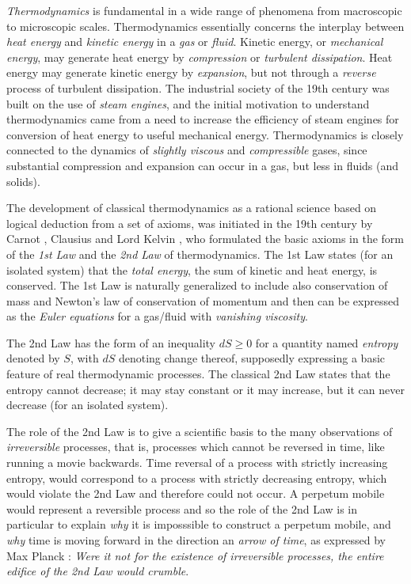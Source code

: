 \emph{Thermodynamics} is fundamental in a wide range of phenomena from
macroscopic to microscopic scales. 
Thermodynamics essentially concerns the interplay between \emph{heat energy} 
and \emph{kinetic energy} in a \emph{gas} or \emph{fluid}. 
Kinetic energy, or \emph{mechanical energy}, 
may generate heat energy by 
\emph{compression}
or \emph{turbulent dissipation}. 
Heat energy may generate kinetic energy by \emph{expansion}, but
not through a \emph{reverse} process of turbulent dissipation. 
The industrial society
of the 19th century was built on the use of \emph{steam engines}, and the 
initial motivation to understand thermodynamics came from a need to
increase the efficiency of steam engines for conversion of heat energy to
useful mechanical energy. 
Thermodynamics is closely connected to the dynamics of \emph{slightly viscous}
and \emph{compressible} gases, since substantial compression and 
expansion can occur in a gas, but less in fluids (and solids).

The development of classical thermodynamics as a rational science 
based on logical deduction from a set of axioms, was initiated in 
the 19th century by Carnot \cite{carnot}, Clausius 
\cite{clausius} and Lord Kelvin \cite{kelvin}, who formulated
the basic axioms in the form of the \emph{1st Law} and the \emph{2nd Law} of
thermodynamics. The 1st Law states (for an isolated system)
that the \emph{total energy},
the sum of kinetic and heat energy, is conserved.
The 1st Law is naturally generalized to include also conservation 
of mass and Newton's law of conservation of momentum and then 
can be expressed as the \emph{Euler equations} for  a gas/fluid 
with \emph{vanishing viscosity}.

The 2nd Law has the form of an inequality 
$dS\ge 0$ for a quantity
named \emph{entropy} denoted by
$S$, with $dS$ denoting change thereof, supposedly  
expressing a basic feature of real thermodynamic processes.
The classical 2nd Law states that the entropy cannot decrease; 
it may stay constant or it may increase,
but it can never decrease (for an isolated system). 

The role of the 2nd Law is
to give a scientific basis to the many observations  
of \emph{irreversible} processes, that is, processes which cannot 
be reversed in time, like running a movie backwards. 
Time reversal of a 
process with strictly increasing entropy, would correspond
to a process with strictly 
decreasing entropy, which would violate the 2nd Law and therefore could
not occur. A perpetum mobile would represent a reversible
process and so the role of the 2nd Law is in particular to explain \emph{why}
it is imposssible to construct a perpetum mobile, and
\emph{why} time is moving forward in the direction an
\emph{arrow of time}, as expressed by  Max Planck 
\cite{planck1,planck2,planck3}: \emph{Were it not for the 
existence of irreversible processes, the entire edifice
of the 2nd Law would crumble}.

